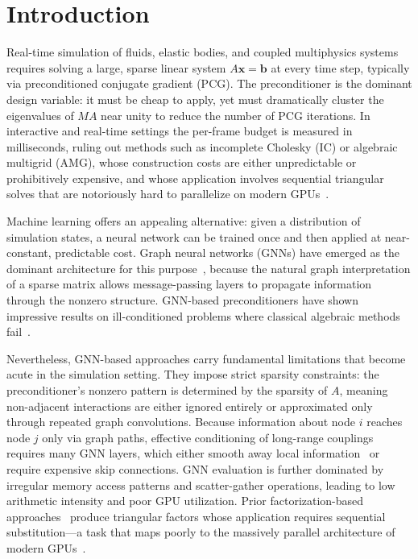 \documentclass[acmtog,anonymous,review]{acmart}
\begin{document}

\maketitle

\section{Introduction}
\label{sec:intro}

Real-time simulation of fluids, elastic bodies, and coupled multiphysics systems requires solving
a large, sparse linear system $A\mathbf{x} = \mathbf{b}$ at every time step, typically via
preconditioned conjugate gradient (PCG).  The preconditioner is the dominant design variable: it
must be cheap to apply, yet must dramatically cluster the eigenvalues of $MA$ near unity to reduce
the number of PCG iterations.  In interactive and real-time settings the per-frame budget is
measured in milliseconds, ruling out methods such as incomplete Cholesky (IC) or algebraic
multigrid (AMG), whose construction costs are either unpredictable or prohibitively expensive, and
whose application involves sequential triangular solves that are notoriously hard to parallelize on
modern GPUs~\cite{yang2025sparse}.

Machine learning offers an appealing alternative: given a distribution of simulation states, a
neural network can be trained once and then applied at near-constant, predictable cost.  Graph
neural networks (GNNs) have emerged as the dominant architecture for this
purpose~\cite{li2023learning,hausner2023neural,chen2024gnp,yang2025sparse}, because the natural
graph interpretation of a sparse matrix allows message-passing layers to propagate information
through the nonzero structure.  GNN-based preconditioners have shown impressive results on
ill-conditioned problems where classical algebraic methods fail~\cite{chen2024gnp}.

Nevertheless, GNN-based approaches carry fundamental limitations that become acute in the
simulation setting.  They impose strict sparsity constraints: the preconditioner's nonzero pattern
is determined by the sparsity of $A$, meaning non-adjacent interactions are either ignored
entirely or approximated only through repeated graph convolutions.  Because information about node
$i$ reaches node $j$ only via graph paths, effective conditioning of long-range couplings requires
many GNN layers, which either smooth away local information~\cite{chen2020simple} or require
expensive skip connections.  GNN evaluation is further dominated by irregular memory access
patterns and scatter-gather operations, leading to low arithmetic intensity and poor GPU
utilization.  Prior factorization-based approaches~\cite{li2023learning,hausner2023neural} produce
triangular factors whose application requires sequential substitution---a task that maps poorly to
the massively parallel architecture of modern GPUs~\cite{yang2025sparse}.
\end{document}

